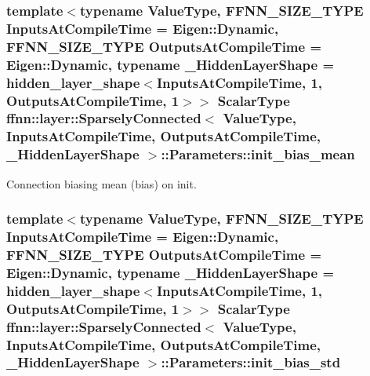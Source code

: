 \hypertarget{structffnn_1_1layer_1_1_sparsely_connected_1_1_parameters_ae2de00161c3080f10b1213fd296907b1}{
\subsubsection[{init\-\_\-bias\-\_\-mean}]{\setlength{\rightskip}{0pt plus 5cm}template$<$typename Value\-Type, F\-F\-N\-N\-\_\-\-S\-I\-Z\-E\-\_\-\-T\-Y\-P\-E Inputs\-At\-Compile\-Time = Eigen\-::\-Dynamic, F\-F\-N\-N\-\_\-\-S\-I\-Z\-E\-\_\-\-T\-Y\-P\-E Outputs\-At\-Compile\-Time = Eigen\-::\-Dynamic, typename \-\_\-\-Hidden\-Layer\-Shape = hidden\-\_\-layer\-\_\-shape$<$\-Inputs\-At\-Compile\-Time, 1, Outputs\-At\-Compile\-Time, 1$>$$>$ {\bf Scalar\-Type} {\bf ffnn\-::layer\-::\-Sparsely\-Connected}$<$ Value\-Type, Inputs\-At\-Compile\-Time, Outputs\-At\-Compile\-Time, \-\_\-\-Hidden\-Layer\-Shape $>$\-::Parameters\-::init\-\_\-bias\-\_\-mean}}\label{structffnn_1_1layer_1_1_sparsely_connected_1_1_parameters_ae2de00161c3080f10b1213fd296907b1}


Connection biasing mean (bias) on init. 

\hypertarget{structffnn_1_1layer_1_1_sparsely_connected_1_1_parameters_a7ff5cde21ad93390fcd0a608abf2b474}{
\subsubsection[{init\-\_\-bias\-\_\-std}]{\setlength{\rightskip}{0pt plus 5cm}template$<$typename Value\-Type, F\-F\-N\-N\-\_\-\-S\-I\-Z\-E\-\_\-\-T\-Y\-P\-E Inputs\-At\-Compile\-Time = Eigen\-::\-Dynamic, F\-F\-N\-N\-\_\-\-S\-I\-Z\-E\-\_\-\-T\-Y\-P\-E Outputs\-At\-Compile\-Time = Eigen\-::\-Dynamic, typename \-\_\-\-Hidden\-Layer\-Shape = hidden\-\_\-layer\-\_\-shape$<$\-Inputs\-At\-Compile\-Time, 1, Outputs\-At\-Compile\-Time, 1$>$$>$ {\bf Scalar\-Type} {\bf ffnn\-::layer\-::\-Sparsely\-Connected}$<$ Value\-Type, Inputs\-At\-Compile\-Time, Outputs\-At\-Compile\-Time, \-\_\-\-Hidden\-Layer\-Shape $>$\-::Parameters\-::init\-\_\-bias\-\_\-std}}\label{structffnn_1_1layer_1_1_sparsely_connected_1_1_parameters_a7ff5cde21ad93390fcd0a608abf2b474}


